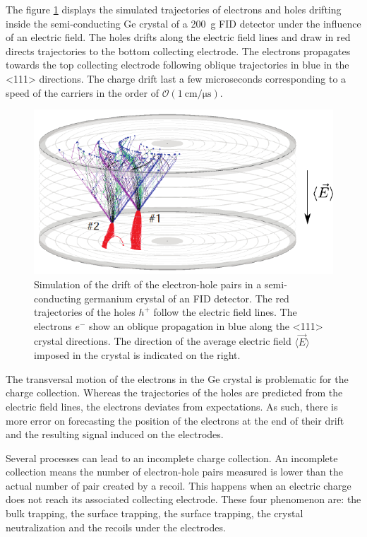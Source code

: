 The figure \ref{fig:oblique-propagation} displays the simulated \cite{Broniatowski2014} trajectories of electrons and holes drifting inside the semi-conducting Ge crystal of a \SI{200}{\g} \Edelweiss{} FID detector under the influence of an electric field. The holes drifts along the electric field lines and draw in red directs trajectories to the bottom collecting electrode. The electrons propagates towards the top collecting electrode following oblique trajectories in blue in the <111> directions. The charge drift last a few microseconds corresponding to a speed of the carriers in the order of $\mathcal{O}(\SI{1}{\cm\per\micro\s})$.

\begin{figure}
\centering
\includegraphics[scale=1]{Figures/Electrodes/transversal_trajectories.pdf}
\caption{Simulation of the drift of the electron-hole pairs in a semi-conducting germanium crystal of an \Edelweiss{} FID detector. The red trajectories of the holes $h^+$ follow the electric field lines. The electrons $e^-$ show an oblique propagation in blue along the <111> crystal directions. The direction of the average electric field $\langle \vec{E} \rangle$ imposed in the crystal is indicated on the right.}
\label{fig:oblique-propagation}
\end{figure}

The transversal motion of the electrons in the Ge crystal is problematic for the charge collection. Whereas the trajectories of the holes are predicted from the electric field lines, the electrons deviates from expectations. As such, there is more error on forecasting the position of the electrons at the end of their drift and the resulting signal induced on the electrodes. 

Several processes can lead to an incomplete charge collection. An incomplete collection means the number of electron-hole pairs measured is lower than the actual number of pair created by a recoil. This happens when an electric charge does not reach its associated collecting electrode. These four phenomenon are: the bulk trapping, the surface trapping, the surface trapping, the crystal neutralization and the recoils under the electrodes.

